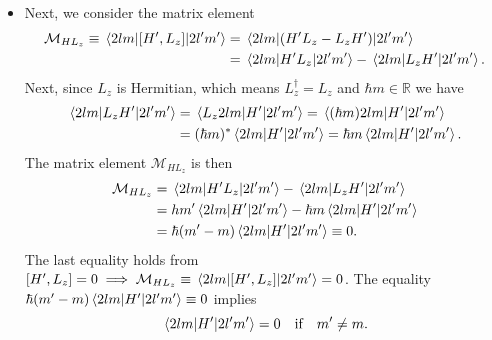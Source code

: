 \documentclass[11pt, a4paper]{article}
\begin{document}
\begin{itemize}
	\item Next, we consider the matrix element
	\begin{align*}
		\mathcal{M}_{HL_{z}} \equiv \mel{2lm}{[H', L_{z}]}{2l'm'} &= \mel{2lm}{(H' L_{z} - L_{z}H')}{2l'm'} \\
		& = \mel{2lm}{H'L_{z}}{2l'm'} - \mel{2lm}{L_{z}H'}{2l'm'}.
	\end{align*}
	Next, since $ L_{z} $ is Hermitian, which means $ L_{z}^{\dagger} = L_{z} $ and $ \hbar m \in \mathbb{R} $ we have
	\begin{align*}
		\mel{2lm}{L_{z}H'}{2l'm'} & = \mel{L_{z}2lm}{H'}{2l'm'} = \mel{(\hbar m)2lm}{H'}{2l'm'} \\
		& = (\hbar m)^{*}\mel{2lm}{H'}{2l'm'} = \hbar m \mel{2lm}{H'}{2l'm'}.
	\end{align*}
	The matrix element $ \mathcal{M}_{HL_{z}} $ is then
	\begin{align*}
		\mathcal{M}_{HL_{z}} &= \mel{2lm}{H'L_{z}}{2l'm'} - \mel{2lm}{L_{z}H'}{2l'm'} \\
		& = hm'\mel{2lm}{H'}{2l'm'} - \hbar m \mel{2lm}{H'}{2l'm'}\\
		& = \hbar(m' - m)\mel{2lm}{H'}{2l'm'} \equiv 0.
	\end{align*}
	The last equality holds from $ [H', L_{z}] = 0 \implies \mathcal{M}_{HL_{z}} \equiv \mel{2lm}{[H', L_{z}]}{2l'm'} = 0 $. The equality $ \hbar(m' - m)\mel{2lm}{H'}{2l'm'} \equiv 0 $ implies
	\begin{equation*}
		\mel{2lm}{H'}{2l'm'} = 0 \quad \text{if} \quad 	m' \neq m .
	\end{equation*}


\end{itemize}
\end{document}
